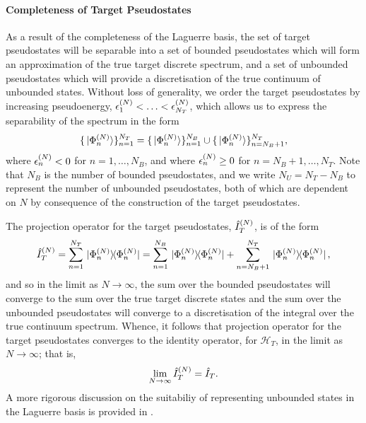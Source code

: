 \documentclass[]{article}
\begin{document}
\paragraph{Completeness of Target Pseudostates}
\label{sec:th-ccc-target-compl}

As a result of the completeness of the Laguerre basis, the set of target
pseudostates will be separable into a set of bounded pseudostates which will
form an approximation of the true target discrete spectrum, and a set of
unbounded pseudostates which will provide a discretisation of the true continuum
of unbounded states.
Without loss of generality, we order the target pseudostates by increasing
pseudoenergy, $\epsilon_{1}^{(N)} < \dotsc < \epsilon_{N_{T}}^{(N)}$,
which allows us to express the separability of the spectrum in the form
\begin{equation}
  \label{eq:target-spectrum-separable}
  \lbrace\ket*{\Phi_{n}^{(N)}}\rbrace_{n = 1}^{N_{T}}
  =
  \lbrace\ket*{\Phi_{n}^{(N)}}\rbrace_{n = 1}^{N_{B}}
  \cup
  \lbrace\ket*{\Phi_{n}^{(N)}}\rbrace_{n = N_{B} + 1}^{N_{T}}
  ,
\end{equation}
where $\epsilon_{n}^{(N)} < 0$ for $n = 1, \dotsc, N_{B}$, and where
$\epsilon_{n}^{(N)} \geq 0$ for $n = N_{B} + 1, \dotsc, N_{T}$.
Note that $N_{B}$ is the number of bounded pseudostates, and we write
$N_{U} = N_{T} - N_{B}$ to represent the number of unbounded pseudostates, both of
which are dependent on $N$ by consequence of the construction of the target
pseudostates.

The projection operator for the target pseudostates, $\hat{I}_{T}^{(N)}$, is
of the form
\begin{equation}
  \label{eq:target-projection}
  \hat{I}_{T}^{(N)}
  =
  \sum_{n = 1}^{N_{T}}
  \ketbra*
  {\Phi_{n}^{(N)}}
  {\Phi_{n}^{(N)}}
  =
  \sum_{n = 1}^{N_{B}}
  \ketbra*
  {\Phi_{n}^{(N)}}
  {\Phi_{n}^{(N)}}
  +
  \sum_{n = N_{B} + 1}^{N_{T}}
  \ketbra*
  {\Phi_{n}^{(N)}}
  {\Phi_{n}^{(N)}}
  ,
\end{equation}
and so in the limit as $N \to \infty$, the sum over the bounded pseudostates
will converge to the sum over the true target discrete states
and the sum over the unbounded pseudostates will converge to a discretisation of
the integral over the true continuum spectrum.
Whence, it follows that projection operator for the target pseudostates
converges to the identity operator, for $\mathcal{H}_{T}$,
in the limit as $N \to \infty$; that is,
\begin{equation}
  \label{eq:target-projection-convergence}
  \lim_{N \to \infty}
  \hat{I}_{T}^{(N)}
  =
  \hat{I}_{T}
  .
\end{equation}
A more rigorous discussion on the suitabiliy of representing unbounded states in
the Laguerre basis is provided in \cite[5-9]{BRAY19951}.
\end{document}
